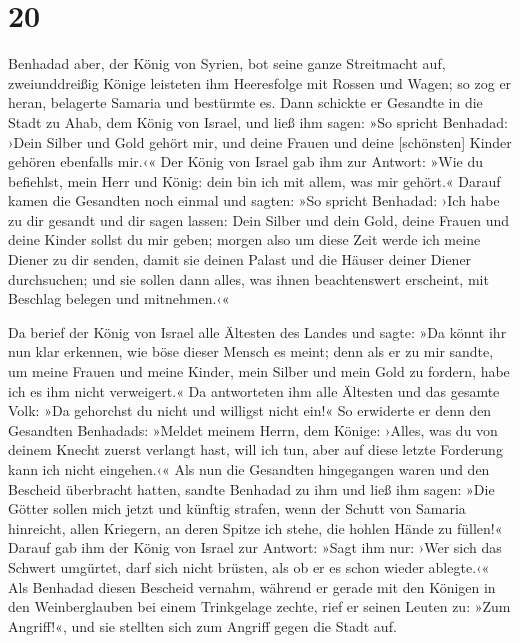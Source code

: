\hypertarget{section-19}{%
\section{20}\label{section-19}}

Benhadad aber, der König von Syrien, bot seine ganze
Streitmacht auf, zweiunddreißig Könige leisteten ihm Heeresfolge mit
Rossen und Wagen; so zog er heran, belagerte Samaria und bestürmte es.
Dann schickte er Gesandte in die Stadt zu Ahab, dem König
von Israel, und ließ ihm sagen: »So spricht Benhadad:
›Dein Silber und Gold gehört mir, und deine Frauen und deine
{[}schönsten{]} Kinder gehören ebenfalls mir.‹« Der König
von Israel gab ihm zur Antwort: »Wie du befiehlst, mein Herr und König:
dein bin ich mit allem, was mir gehört.« Darauf kamen die
Gesandten noch einmal und sagten: »So spricht Benhadad: ›Ich habe zu dir
gesandt und dir sagen lassen: Dein Silber und dein Gold, deine Frauen
und deine Kinder sollst du mir geben; morgen also um diese
Zeit werde ich meine Diener zu dir senden, damit sie deinen Palast und
die Häuser deiner Diener durchsuchen; und sie sollen dann alles, was
ihnen beachtenswert erscheint, mit Beschlag belegen und mitnehmen.‹«

Da berief der König von Israel alle Ältesten des Landes
und sagte: »Da könnt ihr nun klar erkennen, wie böse dieser Mensch es
meint; denn als er zu mir sandte, um meine Frauen und meine Kinder, mein
Silber und mein Gold zu fordern, habe ich es ihm nicht verweigert.«
Da antworteten ihm alle Ältesten und das gesamte Volk: »Da
gehorchst du nicht und willigst nicht ein!« So erwiderte
er denn den Gesandten Benhadads: »Meldet meinem Herrn, dem Könige:
›Alles, was du von deinem Knecht zuerst verlangt hast, will ich tun,
aber auf diese letzte Forderung kann ich nicht eingehen.‹« Als nun die
Gesandten hingegangen waren und den Bescheid überbracht hatten,
sandte Benhadad zu ihm und ließ ihm sagen: »Die Götter
sollen mich jetzt und künftig strafen, wenn der Schutt von Samaria
hinreicht, allen Kriegern, an deren Spitze ich stehe, die hohlen Hände
zu füllen!« Darauf gab ihm der König von Israel zur
Antwort: »Sagt ihm nur: ›Wer sich das Schwert umgürtet, darf sich nicht
brüsten, als ob er es schon wieder ablegte.‹« Als
Benhadad diesen Bescheid vernahm, während er gerade mit den Königen in
den Weinberglauben bei einem Trinkgelage zechte, rief er seinen Leuten
zu: »Zum Angriff!«, und sie stellten sich zum Angriff gegen die Stadt
auf.

